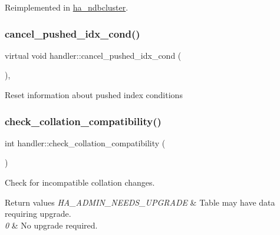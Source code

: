 Reimplemented in \mbox{\hyperlink{classha__ndbcluster_a3fe3719d8dd1d5f41467250d632abd3c}{ha\+\_\+ndbcluster}}.

\mbox{\label{classhandler_a41cc6ba204aa4d1bacc35d9d1d75ab15}} 
\subsubsection{\texorpdfstring{cancel\+\_\+pushed\+\_\+idx\+\_\+cond()}{cancel\_pushed\_idx\_cond()}}
{\footnotesize\ttfamily virtual void handler\+::cancel\+\_\+pushed\+\_\+idx\+\_\+cond (\begin{DoxyParamCaption}{ }\end{DoxyParamCaption})\hspace{0.3cm}{\ttfamily [inline]}, {\ttfamily [virtual]}}

Reset information about pushed index conditions \mbox{\label{classhandler_a234580f9765751ce185182dd1edc3bdb}} 
\subsubsection{\texorpdfstring{check\+\_\+collation\+\_\+compatibility()}{check\_collation\_compatibility()}}
{\footnotesize\ttfamily int handler\+::check\+\_\+collation\+\_\+compatibility (\begin{DoxyParamCaption}{ }\end{DoxyParamCaption})}

Check for incompatible collation changes.


\begin{DoxyRetVals}{Return values}
{\em H\+A\+\_\+\+A\+D\+M\+I\+N\+\_\+\+N\+E\+E\+D\+S\+\_\+\+U\+P\+G\+R\+A\+DE} & Table may have data requiring upgrade. \\
\hline
{\em 0} & No upgrade required. \\
\hline
\end{DoxyRetVals}
\mbox{\label{classhandler_a36d800c8dafbc9efde9af932305529e4}} 
